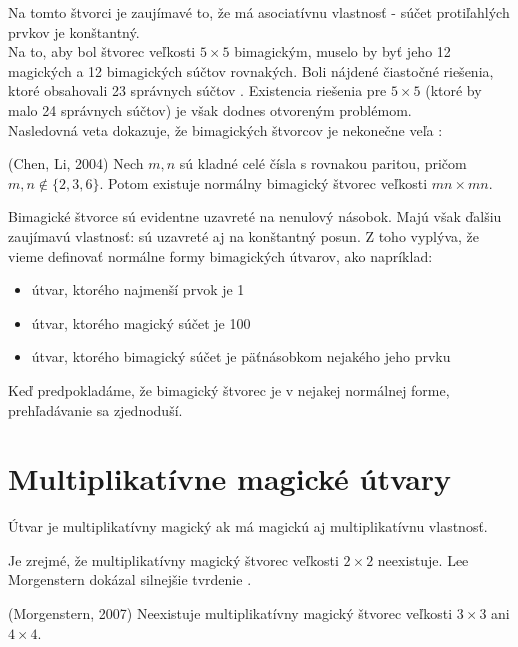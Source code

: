Na tomto štvorci je zaujímavé to, že má asociatívnu vlastnosť - súčet protiľahlých prvkov je konštantný. \\

Na to, aby bol štvorec veľkosti $5 \times 5$ bimagickým, muselo by byť jeho 12 magických a 12 bimagických súčtov rovnakých. Boli nájdené čiastočné riešenia, ktoré obsahovali 23 správnych súčtov \cite{multimagie}. Existencia riešenia pre $5 \times 5$ (ktoré by malo 24 správnych súčtov) je však dodnes otvoreným problémom. \\

Nasledovná veta dokazuje, že bimagických štvorcov je nekonečne veľa \cite{bimagic}:

\begin{theorem} (Chen, Li, 2004) Nech $m,n$ sú kladné celé čísla s rovnakou paritou, pričom $m,n \notin \{2,3,6\}$. Potom existuje normálny bimagický štvorec veľkosti $mn \times mn$.
\end{theorem}

Bimagické štvorce sú evidentne uzavreté na nenulový násobok. Majú však ďalšiu zaujímavú vlastnosť: sú uzavreté aj na konštantný posun. Z toho vyplýva, že vieme definovať normálne formy bimagických útvarov, ako napríklad:
\begin{itemize}
\item útvar, ktorého najmenší prvok je 1
\item útvar, ktorého magický súčet je 100
\item útvar, ktorého bimagický súčet je päťnásobkom nejakého jeho prvku
\end{itemize}

Keď predpokladáme, že bimagický štvorec je v nejakej normálnej forme, prehľadávanie sa zjednoduší. \\

\section{Multiplikatívne magické útvary}
\begin{definition} Útvar je multiplikatívny magický ak má magickú aj multiplikatívnu vlastnosť.
\end{definition}

Je zrejmé, že multiplikatívny magický štvorec veľkosti $2 \times 2$ neexistuje. Lee Morgenstern dokázal silnejšie tvrdenie \cite{multimagie}.

\begin{theorem} (Morgenstern, 2007) Neexistuje multiplikatívny magický štvorec veľkosti $3 \times 3$ ani $4 \times 4$.
\end{theorem}

